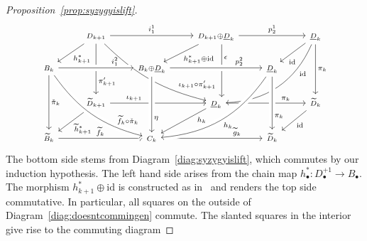 \documentclass[12pt,a4paper]{article}
\numberwithin{equation}{section}
\theoremstyle{nonumberplain}
\newtheorem{proof}{Proof}
\begin{document}
\begin{proof}[Proposition~\ref{prop:syzygyislift}]
\begin{equation}\label{diag:doesntcommingen}
\begin{tikzcd}
  & {\scriptstyle D_{k+1}} \arrow[rr, "{\scriptstyle i_1^1}"] \arrow[ddrr, bend right = 15, "{\scriptstyle \iota_{k+1} \circ \pi_{k+1}'}" near end] \arrow[dl, "{\scriptstyle h_{k+1}^{\ast}}"] \arrow[dd, "{\scriptstyle \pi_{k+1}'}" near end]
    & & {\scriptstyle D_{k+1} \oplus \underline{D}_k} \arrow[rr, "{\scriptstyle p_2^1}"] \arrow[dl, "{\scriptstyle h_{k+1}^{\ast} \oplus \mathrm{id}}"] \arrow[dd, shift left = 2mm, "{\scriptstyle \epsilon}" near start]
    & & {\scriptstyle \underline{D}_k} \arrow[dl, "{\scriptstyle \mathrm{id}}" near end] \arrow[ddll, bend left = 32, "{\scriptstyle \mathrm{id}}" near start] \arrow[dd, "{\scriptstyle \pi_k}"] \\
  {\scriptstyle B_k} \arrow[rr, crossing over, "{\scriptstyle i_1^2}" near end] \arrow[dd, "{\scriptstyle \check{\pi}_k}"]
    & & {\scriptstyle B_k \oplus \underline{D}_k} \arrow[rr, crossing over, "{\scriptstyle p_2^2}" near end]
    & & {\scriptstyle \underline{D}_k} & \\
  & {\scriptstyle \widetilde{D}_{k+1}} \arrow[rr, "{\scriptstyle \iota_{k+1}}" near start] \arrow[dl, "{\scriptstyle \widetilde{h}_{k+1}^{\ast}}"]
    & & {\scriptstyle \underline{D}_k} \arrow[rr, "{\scriptstyle \pi_k}" near end] \arrow[dl, "{\scriptstyle h_k}" near start]
    & & {\scriptstyle \widetilde{D}_k} \arrow[dl, "{\scriptstyle \mathrm{id}}"] \\
  {\scriptstyle \widetilde{B}_k} \arrow[rr, "{\scriptstyle \widetilde{f}_k}"]
    & & {\scriptstyle C_k} \arrow[rr, "{\scriptstyle \widetilde{g}_k}" near end] \arrow[from = uull, bend right = 20, crossing over, "{\scriptstyle \widetilde{f}_k \circ \check{\pi}_k}" near end] \arrow[from = uu, crossing over, "{\scriptstyle \eta}" near end] \arrow[from = uurr, bend left = 25, crossing over, "{\scriptstyle h_k}"]
    & & {\scriptstyle \widetilde{D}_k} \arrow[from = uu, crossing over, "{\scriptstyle \pi_k}" near end] &
\end{tikzcd}
\end{equation}
The bottom side stems from Diagram~\ref{diag:syzygyislift}, which commutes by our induction hypothesis. The left hand side arises from the chain map $h_{\bullet}^{\ast}: D_{\bullet}^{+1} \rightarrow B_{\bullet}$. The morphism $h_{k+1}^{\ast} \oplus \mathrm{id}$ is constructed as in~\cite[p.~251]{mac95} and renders the top side commutative. In particular, all squares on the outside of Diagram~\ref{diag:doesntcommingen} commute. The slanted squares in the interior give rise to the commuting diagram

\end{proof}
\end{document}
